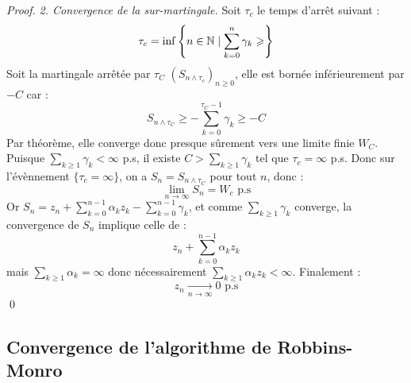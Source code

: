 \begin{proof}
    \emph{2. Convergence de la sur-martingale. } Soit $ \tau_c$ le temps d'arrêt suivant : 
        $$ \tau_c = \inf \left\{ n \in \mathbb{N} \mid \sum_{k=0}^{n} \gamma_k \geqslant  \right\} $$ 
    Soit la martingale arrêtée par $ \tau_C$ $(S_{n \wedge \tau_c})_{n \geqslant 0}$, elle est bornée inférieurement par $-C$ car : 
        $$ S_{n \wedge \tau_C} \geqslant - \sum_{k=0}^{ \tau_C -1} \gamma_k \geqslant - C $$ 
    Par théorème, elle converge donc presque sûrement vers une limite finie $W_C$. 
    Puisque $ \sum_{k \geqslant 1} \gamma_k < \infty$ p.s, il existe $C > \sum_{k \geqslant 1} \gamma_k $ tel que 
    $ \tau_c= \infty$ p.s. Donc sur l'évènnement $\{ \tau_c = \infty\}$, on a $S_n = S_{n \wedge \tau_C}$ pour tout $n$, donc :
        $$ \lim_{n \to \infty} S_n = W_c \text{ p.s} $$ 
    Or $S_n = z_n + \sum_{k=0}^{n-1} \alpha_k z_k - \sum_{k=0}^{n-1} \gamma_k$, et comme $ \sum_{k \geqslant 1} \gamma_k $ converge, 
    la convergence de $S_n$ implique celle de : 
        $$ z_n + \sum_{k=0}^{n-1} \alpha_k z_k $$
    mais $ \sum_{k \geqslant 1} \alpha_k = \infty$ donc nécessairement $ \sum_{k \geqslant1} \alpha_k z_k < \infty$. 
    Finalement : 
        $$ z_n \underset{n \to \infty}{\longrightarrow} 0 \text{ p.s} $$
    \qed 
\end{proof}

\subsection{Convergence de l'algorithme de Robbins-Monro}





